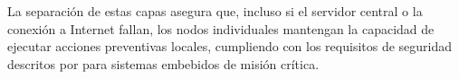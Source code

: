 La separación de estas capas asegura que, incluso si el servidor central o la conexión a Internet fallan, los nodos individuales mantengan la capacidad de ejecutar acciones preventivas locales, cumpliendo con los requisitos de seguridad descritos por \citet{valvano2014volume1} para sistemas embebidos de misión crítica.

